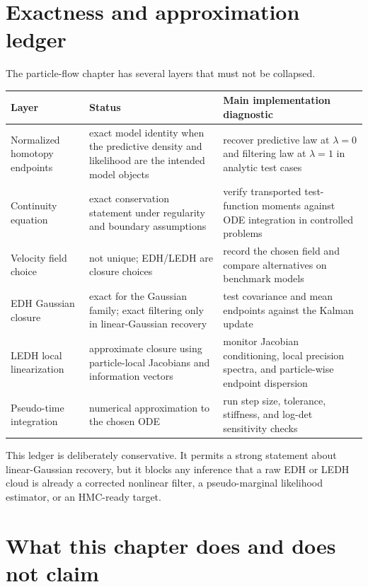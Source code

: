 \section{Exactness and approximation ledger}
\label{sec:bf-pff-claim-ledger}

The particle-flow chapter has several layers that must not be collapsed.

\begin{center}
\small
\begin{tabular}{p{} p{} p{}}
\toprule
Layer & Status & Main implementation diagnostic \\
\midrule
Normalized homotopy endpoints & exact model identity when the predictive
density and likelihood are the intended model objects & recover predictive law
at $\lambda=0$ and filtering law at $\lambda=1$ in analytic test cases \\
Continuity equation & exact conservation statement under regularity and
boundary assumptions & verify transported test-function moments against ODE
integration in controlled problems \\
Velocity field choice & not unique; EDH/LEDH are closure choices & record the
chosen field and compare alternatives on benchmark models \\
EDH Gaussian closure & exact for the Gaussian family; exact filtering only in
linear-Gaussian recovery & test covariance and mean endpoints against the
Kalman update \\
LEDH local linearization & approximate closure using particle-local Jacobians
and information vectors & monitor Jacobian conditioning, local precision
spectra, and particle-wise endpoint dispersion \\
Pseudo-time integration & numerical approximation to the chosen ODE & run step
size, tolerance, stiffness, and log-det sensitivity checks \\
\bottomrule
\end{tabular}
\end{center}

This ledger is deliberately conservative.  It permits a strong statement about
linear-Gaussian recovery, but it blocks any inference that a raw EDH or LEDH
cloud is already a corrected nonlinear filter, a pseudo-marginal likelihood
estimator, or an HMC-ready target.

\section{What this chapter does and does not claim}
\label{sec:bf-pff-chapter-boundary}

